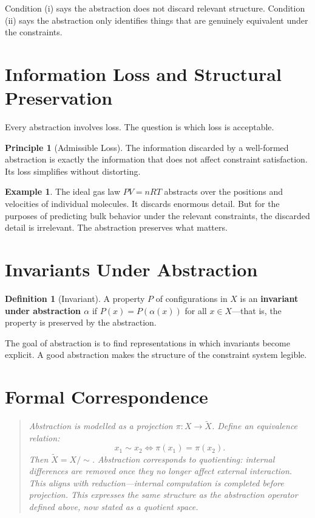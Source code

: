\documentclass[11pt]{book}
\theoremstyle{plain}
\theoremstyle{definition}
\newtheorem{definition}[theorem]{Definition}
\newtheorem{example}[theorem]{Example}
\newtheorem{principle}[theorem]{Principle}
\theoremstyle{remark}
\newenvironment{formalcorrespondence}
  {\begin{quote}\small\itshape}
  {\end{quote}}
\begin{document}
Condition (i) says the abstraction does not discard relevant structure.
Condition (ii) says the abstraction only identifies things that are
genuinely equivalent under the constraints.

\section{Information Loss and Structural Preservation}

Every abstraction involves loss. The question is which loss is acceptable.

\begin{principle}[Admissible Loss]
The information discarded by a well-formed abstraction is exactly the
information that does not affect constraint satisfaction. Its loss
simplifies without distorting.
\end{principle}

\begin{example}
The ideal gas law $PV = nRT$ abstracts over the positions and velocities
of individual molecules. It discards enormous detail. But for the purposes
of predicting bulk behavior under the relevant constraints, the discarded
detail is irrelevant. The abstraction preserves what matters.
\end{example}

\section{Invariants Under Abstraction}

\begin{definition}[Invariant]
A property $P$ of configurations in $X$ is an \textbf{invariant under
abstraction $\alpha$} if $P(x) = P(\alpha(x))$ for all $x \in X$---that
is, the property is preserved by the abstraction.
\end{definition}

The goal of abstraction is to find representations in which invariants
become explicit. A good abstraction makes the structure of the constraint
system legible.

\section*{Formal Correspondence}
\begin{formalcorrespondence}
Abstraction is modelled as a projection $\pi : X \to \tilde{X}$. Define
an equivalence relation:
\[
  x_1 \sim x_2 \iff \pi(x_1) = \pi(x_2).
\]
Then $\tilde{X} = X / {\sim}$. Abstraction corresponds to quotienting:
internal differences are removed once they no longer affect external
interaction. This aligns with reduction---internal computation is
completed before projection. This expresses the same structure as the
abstraction operator defined above, now stated as a quotient space.
\end{formalcorrespondence}
\end{document}
